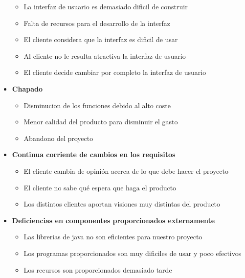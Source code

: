 \documentclass[spanish,a4paper,12pt]{report}	%
\begin{document}
\begin{itemize}
	\begin{itemize}
		\item {La interfaz de usuario es demasiado dificil de construir}
		\item {Falta de recursos para el desarrollo de la interfaz}
		\item {El cliente considera que la interfaz es dificil de usar}
		\item {Al cliente no le resulta atractiva la interfaz de usuario}
		\item {El cliente decide cambiar por completo la interfaz de usuario}
	\end{itemize}
\item \textbf {Chapado}
	\begin{itemize}
		\item {Disminucion de los funciones debido al alto coste}
		\item {Menor calidad del producto para disminuir el gasto}
		\item {Abandono del proyecto}
	\end{itemize}
\item \textbf {Continua corriente de cambios en los requisitos}
	\begin{itemize}
		\item {El cliente cambia de opinión acerca de lo que debe hacer el proyecto}
		\item {El cliente no sabe qué espera que haga el producto}
		\item {Los distintos clientes aportan visiones muy distintas del producto}

	\end{itemize}
\item \textbf {Deficiencias en componentes proporcionados externamente}
	\begin{itemize}
		\item {Las librerias de java no son eficientes para nuestro proyecto}
		\item {Los programas proporcionados son muy dificiles de usar y poco efectivos}
		\item {Los recursos son proporcionados demasiado tarde}


\end{itemize}
\end{itemize}
\end{document}
